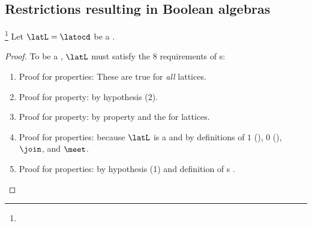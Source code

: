 \subsection{Restrictions resulting in Boolean algebras}
\begin{proposition}
\footnote{
  }
\label{prop:latoc_distrib_boolean}
Let $\latL=\latocd$ be a  .
\end{proposition}
\begin{proof}
To be a , $\latL$ must satisfy the 8 requirements of s:
\begin{enumerate}
  \item Proof for  properties: These are true for \emph{all} lattices.
  \item Proof for  property: by hypothesis (2).
  \item Proof for  property: by  property and 
        the  for lattices.
  \item Proof for  properties: because $\latL$ is a 
        and by definitions of $1$ (), $0$ (), $\join$, and $\meet$.
  \item Proof for  properties: by hypothesis (1) and definition of s .
\end{enumerate}
\end{proof}

